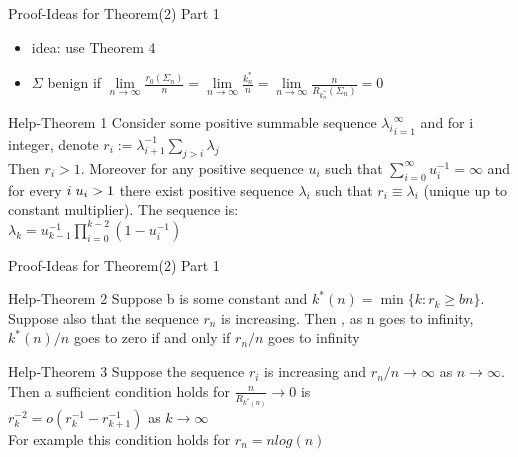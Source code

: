 \documentclass{beamer}
\begin{document}
\begin{frame}{Proof-Ideas for Theorem(2) Part 1}
\begin{itemize}
	\item idea: use Theorem 4
	\item $\Sigma$ benign if $\lim\limits_{n \rightarrow \infty}\frac{r_0(\Sigma_n)}{n} = \lim\limits_{n \rightarrow \infty}\frac{k^*_n}{n} = \lim\limits_{n \rightarrow \infty}\frac{n}{R_{k^*_n}(\Sigma_n)} = 0$
\end{itemize}
\begin{center}
	\begin{block}{Help-Theorem 1}
	Consider some positive summable sequence ${\lambda_i}_{i=1}^\infty $ and for i integer, denote \hspace*{2.3cm} $r_i := \lambda_{i+1}^{-1}\sum\limits_{j>i}\lambda_j$\\
	Then $r_i >1$. Moreover for any positive sequence ${u_i}$ such that $\sum\limits_{i=0}^\infty u_i^{-1} = \infty$ and for every $i \hspace*{0.1cm} u_i>1$ there exist positive sequence ${\lambda_i}$ such that $r_i \equiv \lambda_i$ (unique up to constant multiplier). The sequence is:\\
	\hspace*{3.4 cm}$\lambda_k = u_{k-1}^{-1}\prod\limits_{i=0}^{k-2}(1-u_i^{-1})$
	\end{block}
\end{center}
\end{frame}


\begin{frame}{Proof-Ideas for Theorem(2) Part 1}
	\begin{center}
		\begin{block}{Help-Theorem 2}
			Suppose b is some constant and $k^*(n) = \min\{k: r_k \geq bn\}$. Suppose also that the sequence ${r_n}$ is increasing. Then , as n goes to infinity, $k^*(n)/n$ goes to zero if and only if $r_n/n$ goes to infinity
		\end{block}
	\end{center}

\begin{center}
	\begin{block}{Help-Theorem 3}
		Suppose the sequence ${r_i}$ is increasing and $r_n/n \rightarrow \infty$ as $n \rightarrow \infty$. Then a sufficient condition holds for $\frac{n}{R_{k^*(n)}} \rightarrow 0$ is \\
		\hspace*{3cm}$r_k^{-2} = o(r_k^{-1} - r_{k+1}^{-1})$ as $k \rightarrow \infty$\\
		For example this condition holds for $r_n = nlog(n)$
	\end{block}
\end{center}
\end{frame}
\end{document}
